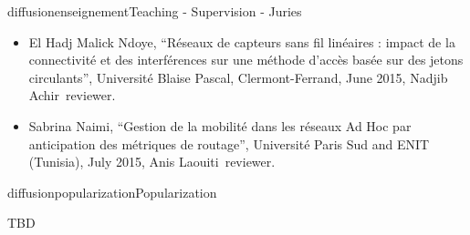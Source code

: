 \documentclass{ra2016}
\begin{document}
\begin{module}{diffusion}{enseignement}{Teaching - Supervision - Juries}
\begin{itemize}
\begin{itemize}
            \item  El Hadj Malick Ndoye, ``Réseaux de capteurs sans fil linéaires : impact de la connectivité et des interférences sur une méthode d'accès basée sur des jetons circulants'', Universit\'e Blaise Pascal,  Clermont-Ferrand, June 2015, Nadjib Achir~reviewer.
            \item  Sabrina Naimi, ``Gestion de la mobilité dans les réseaux Ad Hoc par anticipation des métriques de routage'', Université Paris Sud and ENIT (Tunisia), July 2015, Anis Laouiti~reviewer.
        \end{itemize}
\end{itemize}



\end{module}

\begin{module}{diffusion}{popularization}{Popularization}

TBD 


\end{module}


\end{document}

